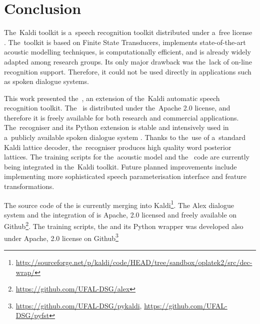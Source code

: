 \chapter{Conclusion}
\label{cha:conclusion}


The~Kaldi toolkit is a~speech recognition toolkit distributed under a~free license \cite{povey2011kaldi}.
The~toolkit is based on Finite State Transducers, implements state-of-the-art acoustic modelling techniques, is computationally efficient, and is already widely adapted among research groups.
Its only major drawback was the~lack of on-line recognition support.
Therefore, it could not be used directly in applications such as spoken dialogue systems.

This work presented the~, an extension of the~Kaldi automatic speech recognition toolkit.
The~ is distributed under the~Apache 2.0 license, and therefore it is freely available for both research and commercial applications.
The~recogniser and its Python extension is stable and intensively used in a~publicly available spoken dialogue system \cite{ptics2014url}.
Thanks to the~use of a~standard Kaldi lattice decoder, the~recogniser produces high quality word posterior lattices.
The training scripts for the~acoustic model and the~ code are currently being integrated in the~Kaldi toolkit.
Future planned improvements include implementing more sophisticated speech parameterisation interface and feature transformations.

The source code of the  is currently merging into Kaldi\footnote{\url{http://sourceforge.net/p/kaldi/code/HEAD/tree/sandbox/oplatek2/src/dec-wrap/}}.
The Alex dialogue system and the integration of  is Apache, 2.0 licensed and freely available on Github\footnote{\url{https://github.com/UFAL-DSG/alex}}.
The training scripts, the  and its Python wrapper  was developed also under Apache, 2.0 license on Github\footnote{\url{https://github.com/UFAL-DSG/pykaldi}, \url{https://github.com/UFAL-DSG/pyfst}} 


